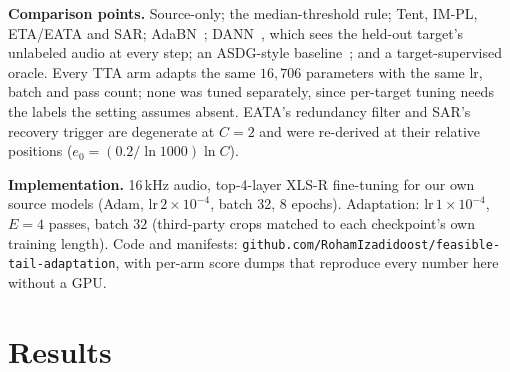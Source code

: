 \documentclass[10pt,letterpaper]{article}
\begin{document}
\textbf{Comparison points.} Source-only; the median-threshold rule; Tent, IM-PL,
ETA/EATA and SAR; AdaBN~\cite{adabn}; DANN~\cite{dann}, which sees the held-out
target's unlabeled audio at every step; an ASDG-style baseline~\cite{asdg}; and
a target-supervised oracle. Every TTA arm adapts the same $16{,}706$ parameters
with the same lr, batch and pass count; none was tuned separately, since
per-target tuning needs the labels the setting assumes absent. EATA's redundancy
filter and SAR's recovery trigger are degenerate at $C{=}2$ and were re-derived
at their relative positions ($e_0{=}(0.2/\ln 1000)\ln C$).

\textbf{Implementation.} 16\,kHz audio, top-4-layer XLS-R fine-tuning for our own
source models (Adam, lr\,$2{\times}10^{-4}$, batch 32, 8 epochs). Adaptation:
lr\,$1{\times}10^{-4}$, $E{=}4$ passes, batch $32$ (third-party crops matched to
each checkpoint's own training length). Code and manifests:
\texttt{github.com/}\-\texttt{RohamIzadidoost/}\-\texttt{feasible-tail-adaptation},
with per-arm score dumps that reproduce every number here without a GPU.

\section{Results}
\label{sec:results}
\end{document}
